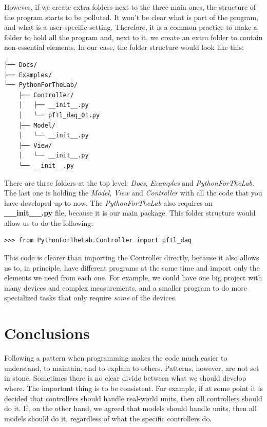 However, if we create extra folders next to the three main ones, the structure of the program starts to be polluted. It won't be clear what is part of the program, and what is a user-specific setting. Therefore, it is a common practice to make a folder to hold all the program and, next to it, we create an extra folder to contain non-essential elements. In our case, the folder structure would look like this:

\begin{verbatim}
├── Docs/
├── Examples/
└── PythonForTheLab/
    ├── Controller/
    │   ├── __init__.py
    │   └── pftl_daq_01.py
    ├── Model/
    │   └── __init__.py
    ├── View/
    │   └── __init__.py
    └── __init__.py
\end{verbatim}

There are three folders at the top level: \emph{Docs}, \emph{Examples} and \emph{PythonForTheLab}. The last one is holding the \emph{Model}, \emph{View} and \emph{Controller} with all the code that you have developed up to now. The \emph{PythonForTheLab} also requires an \textbf{\_\_init\_\_.py} file, because it is our main package. This folder structure would allow us to do the following:

\begin{verbatim}
>>> from PythonForTheLab.Controller import pftl_daq
\end{verbatim}

This code is clearer than importing the Controller directly, because it also allows us to, in principle, have different programs at the same time and import only the elements we need from each one. For example, we could have one big project with many devices and complex measurements, and a smaller program to do more specialized tasks that only require \emph{some} of the devices.

\section{Conclusions}\label{sec:layout-conclusions}
Following a pattern when programming makes the code much easier to understand, to maintain, and to explain to others. Patterns, however, are not set in stone. Sometimes there is no clear divide between what we should develop where. The important thing is to be consistent. For example, if at some point it is decided that controllers should handle real-world units, then all controllers should do it. If, on the other hand, we agreed that models should handle units, then all models should do it, regardless of what the specific controllers do.

